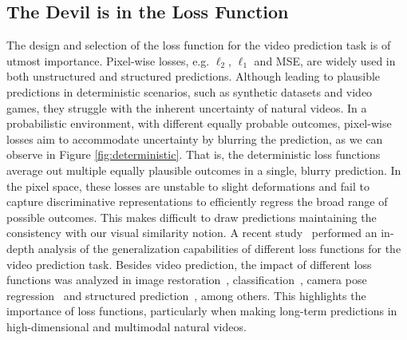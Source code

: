 \subsection{The Devil is in the Loss Function}
The design and selection of the loss function for the video prediction task is of utmost importance. Pixel-wise losses, e.g. $\ell_2$, $\ell_1$ and \ac{MSE}, are widely used in both unstructured and structured predictions. Although leading to plausible predictions in deterministic scenarios, such as synthetic datasets and video games, they struggle with the inherent uncertainty of natural videos. In a probabilistic environment, with different equally probable outcomes, pixel-wise losses aim to accommodate uncertainty by blurring the prediction, as we can observe in Figure \ref{fig:deterministic}. That is, the deterministic loss functions average out multiple equally plausible outcomes in a single, blurry prediction. In the pixel space, these losses are unstable to slight deformations and fail to capture discriminative representations to efficiently regress the broad range of possible outcomes. This makes difficult to draw predictions maintaining the consistency with our visual similarity notion. A recent study~\cite{Aigner2020} performed an in-depth analysis of the generalization capabilities of different loss functions for the video prediction task. Besides video prediction, the impact of different loss functions was analyzed in image restoration~\cite{Zhao2017}, classification~\cite{Janocha2017}, camera pose regression~\cite{Kendall2017} and structured prediction~\cite{Hwang2019}, among others. This highlights the importance of loss functions, particularly when making long-term predictions in high-dimensional and multimodal natural videos.

